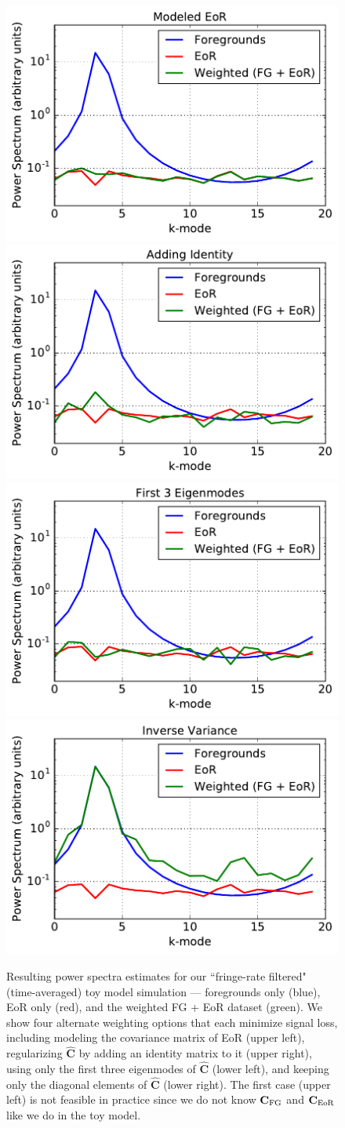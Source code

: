 \documentclass[preprint2,numberedappendix,tighten]{aastex6}  %
\begin{document}
\begin{figure}
	\centering
	\includegraphics[trim={0cm 0cm 0cm 0cm},clip,height=0.3\textwidth]{plots/toy_sigloss10.pdf}
	\includegraphics[trim={0cm 0cm 0cm 0cm},clip,height=0.3\textwidth]{plots/toy_sigloss8.pdf}
	\includegraphics[trim={0cm 0cm 0cm 0cm},clip,height=0.3\textwidth]{plots/toy_sigloss9.pdf}
	\includegraphics[trim={0cm 0cm 0cm 0cm},clip,height=0.3\textwidth]{plots/toy_sigloss11.pdf}
	\caption{Resulting power spectra estimates for our ``fringe-rate filtered" (time-averaged) toy model simulation --- foregrounds only (blue), 
EoR only (red), and the weighted FG + EoR dataset (green). We show four alternate weighting options that each minimize signal 
loss, including modeling the covariance matrix of EoR (upper left), regularizing $\widehat{\textbf{C}}$ by adding an identity matrix to 
it (upper right), using only the first three eigenmodes of $\widehat{\textbf{C}}$ (lower left), and keeping only the diagonal elements of 
$\widehat{\textbf{C}}$ (lower right). The first case (upper left) is not feasible in practice since we do not know $\textbf{C}_{\rm FG}$ and $\textbf{C}_{\rm EoR}$ like we do in the toy model.}
	\label{fig:toy_sigloss8}
\end{figure}
\end{document}
